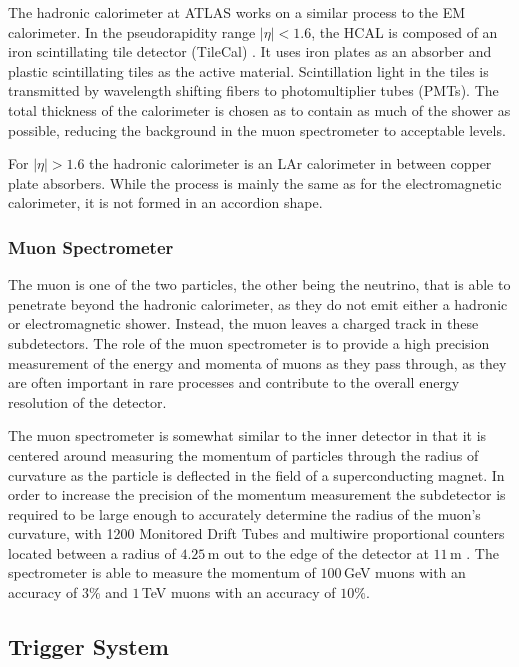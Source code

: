 \documentclass{article}
\begin{document}
The hadronic calorimeter at ATLAS works on a similar process to the EM calorimeter. In the pseudorapidity range $|\eta|<1.6$, the HCAL is composed of an iron scintillating tile detector (TileCal) \cite{ATLASCalorimetry}. It uses iron plates as an absorber and plastic scintillating tiles as the active material. Scintillation light in the tiles is transmitted by wavelength shifting fibers to photomultiplier tubes (PMTs). The total thickness of the calorimeter is chosen as to contain as much of the shower as possible, reducing the background in the muon spectrometer to acceptable levels. 

For $|\eta|>1.6$ the hadronic calorimeter is an LAr calorimeter in between copper plate absorbers. While the process is mainly the same as for the electromagnetic calorimeter, it is not formed in an accordion shape.

\subsubsection{Muon Spectrometer}
\label{sec:ATLAS_DetectorSchematics_Muon}

The muon is one of the two particles, the other being the neutrino, that is able to penetrate beyond the hadronic calorimeter, as they do not emit either a hadronic or electromagnetic shower. Instead, the muon leaves a charged track in these subdetectors. The role of the muon spectrometer is to provide a high precision measurement of the energy and momenta of muons as they pass through, as they are often important in rare processes and contribute to the overall energy resolution of the detector.

The muon spectrometer is somewhat similar to the inner detector in that it is centered around measuring the momentum of particles through the radius of curvature as the particle is deflected in the field of a superconducting magnet. In order to increase the precision of the momentum measurement the subdetector is required to be large enough to accurately determine the radius of the muon's curvature, with 1200 Monitored Drift Tubes and multiwire proportional counters located between a radius of $4.25\,$m out to the edge of the detector at $11\,$m \cite{ATLASMuonSpectrometer}. The spectrometer is able to measure the momentum of $100\,$GeV muons with an accuracy of $3\%$ and $1\,$TeV muons with an accuracy of $10\%$.

\subsection{Trigger System}
\label{sec:ATLAS_Trigger}
\end{document}
